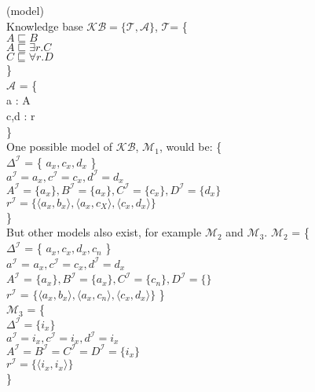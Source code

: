 \begin{myex} (model) \\

\noindent Knowledge base $\mathcal{KB} = \{ \mathcal{T} , \mathcal{A} \}$, 
$ \mathcal{T} $= \{ \\
\indent $A \sqsubseteq B$ \\
\indent $A \sqsubseteq	\exists r.C$ \\
\indent $C \sqsubseteq \forall r.D$\\
\}\\
$ \mathcal{A} $ = \{  \\
\indent a : A \\
\indent c,d : r \\
\} 
\\
One possible model of $\mathcal{KB}$, $\mathcal{M}_1$, would be: \{ \\
\indent $\Delta ^\mathcal{I}$ = \{ $a_x, c_x, d_x$ \} \\
\indent $a^\mathcal{I} = a_x, c^\mathcal{I} = c_x, d^\mathcal{I} = d_x$\\
\indent $A^\mathcal{I} = \{a_x\}, B^\mathcal{I} = \{a_x\}, C^\mathcal{I} = \{c_x\}, D^\mathcal{I} = \{d_x\} $\\
\indent $r^\mathcal{I} = \{ \langle a_x,b_x\rangle , \langle a_x,c_X \rangle, \langle c_x,d_x \rangle \} $ \\
  		\} \\
But other models also exist, for example $\mathcal{M}_2$ and $\mathcal{M}_3$.
$\mathcal{M}_2$ = \{  \\
\indent$ \Delta ^\mathcal{I}$ = \{ $a_x, c_x, d_x, c_n$ \} \\ 
\indent$a^\mathcal{I} $ = $a_x, c^\mathcal{I} = c_x, d^\mathcal{I} = d_x$ \\
\indent$A^\mathcal{I}$ = $\{a_x\}, B^\mathcal{I} = \{a_x\}, C^\mathcal{I} = \{c_n\}, D^\mathcal{I} = \{ \} $ \\
\indent$r^\mathcal{I}$ = $\{ \langle a_x,b_x\rangle , \langle a_x,c_n \rangle, \langle c_x,d_x \rangle \} $
\} \\
$\mathcal{M}_3$ = \{ \\
\indent $\Delta ^\mathcal{I} = \{ i_x\}     $\\
 \indent $a^\mathcal{I} = i_x, c^\mathcal{I} = i_x, d^\mathcal{I} = i_x $\\
\indent $A^\mathcal{I} = B^\mathcal{I} = C^\mathcal{I} = D^\mathcal{I} = \{i_x\}$\\
\indent $r^\mathcal{I} = \{ \langle i_x, i_x \rangle \}$\\
\}
\end{myex}
